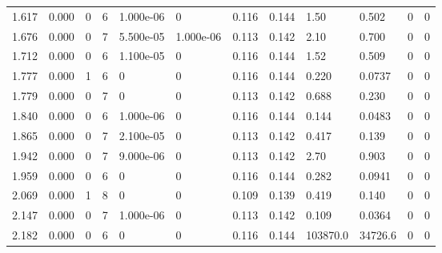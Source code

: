 \documentclass[preview]{standalone}
\begin{document}
{{\begin{tabular}{L{1.2cm}C{1.2cm} C{0.3cm}C{0.5cm} C{1.4cm}C{1.4cm} C{1.4cm}C{1.4cm} C{1.6cm}C{1.6cm} C{1.6cm}C{1.6cm}}
  1.617  &  0.000  & 0     &  6 &  1.000e-06  & 0  &  0.116&   0.144& 1.50 & 0.502   &  0 & 0  \\ 
  1.676  &  0.000  & 0     &  7 &  5.500e-05  & 1.000e-06  &  0.113&   0.142& 2.10 & 0.700   &  0 & 0  \\ 
  1.712  &  0.000  & 0     &  6 &  1.100e-05  & 0  &  0.116&   0.144& 1.52 & 0.509   &  0 & 0  \\ 
  1.777  &  0.000  & 1     &  6 &  0  & 0  &  0.116&   0.144& 0.220 & 0.0737   &  0 & 0  \\ 
  1.779  &  0.000  & 0     &  7 &  0  & 0  &  0.113&   0.142& 0.688 & 0.230   &  0 & 0  \\ 
  1.840  &  0.000  & 0     &  6 &  1.000e-06  & 0  &  0.116&   0.144& 0.144 & 0.0483   &  0 & 0  \\ 
  1.865  &  0.000  & 0     &  7 &  2.100e-05  & 0  &  0.113&   0.142& 0.417 & 0.139   &  0 & 0  \\ 
  1.942  &  0.000  & 0     &  7 &  9.000e-06  & 0  &  0.113&   0.142& 2.70 & 0.903   &  0 & 0  \\ 
  1.959  &  0.000  & 0     &  6 &  0  & 0  &  0.116&   0.144& 0.282 & 0.0941   &  0 & 0  \\ 
  2.069  &  0.000  & 1     &  8 &  0  & 0  &  0.109&   0.139& 0.419 & 0.140   &  0 & 0  \\ 
  2.147  &  0.000  & 0     &  7 &  1.000e-06  & 0  &  0.113&   0.142& 0.109 & 0.0364   &  0 & 0  \\ 
  2.182  &  0.000  & 0     &  6 &  0  & 0  &  0.116&   0.144& 103870.0 & 34726.6   &  0 & 0  \\ 
\hline 
\end{tabular} 

}}
\end{document}
